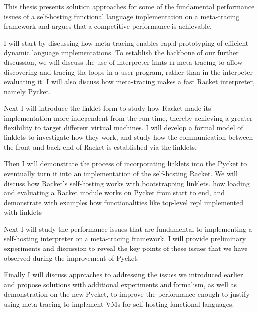 This thesis presents solution approaches for some of the fundamental
performance issues of a self-hosting functional language
implementation on a meta-tracing framework and argues that a
competitive performance is achievable.

I will start by discussing how meta-tracing enables rapid prototyping
of efficient dynamic language implementations. To establish the
backbone of our further discussion, we will discuss the use of
interpreter hints in meta-tracing to allow discovering and tracing the
loops in a user program, rather than in the interpeter evaluating
it. I will also discuss how meta-tracing makes a fast Racket
interpreter, namely Pycket.

Next I will introduce the linklet form to study how Racket made its
implementation more independent from the run-time, thereby achieving a
greater flexibility to target different virtual machines. I will
develop a formal model of linklets to investigate how they work, and
study how the communication between the front and back-end of Racket
is established via the linklets.

Then I will demonstrate the process of incorporating linklets into the
Pycket to eventually turn it into an implementation of the
self-hosting Racket. We will discuss how Racket's self-hosting works
with bootstrapping linklets, how loading and evaluating a Racket
module works on Pycket from start to end, and demonstrate with
examples how functionalities like top-level repl implemented with
linklets

Next I will study the performance issues that are fundamental to
implementing a self-hosting interpreter on a meta-tracing framework. I
will provide preliminary experiments and discussion to reveal the key
points of these issues that we have observed during the improvement of
Pycket.

Finally I will discuss approaches to addressing the issues we
introduced earlier and propose solutions with additional experiments
and formalism, as well as demonstration on the new Pycket, to improve
the performance enough to justify using meta-tracing to implement VMs
for self-hosting functional languages.
